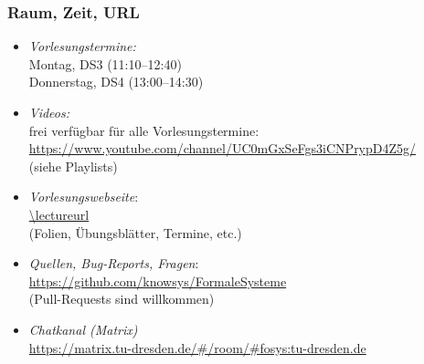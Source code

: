 \documentclass[aspectratio=1610,onlymath]{beamer}
\begin{document}
\maketitle



% 
% 

\begin{frame}\frametitle{Raum, Zeit, URL}

\begin{itemize}
\item \emph{Vorlesungstermine:}\\
	Montag, DS3 (11:10--12:40)\\
	Donnerstag, DS4 (13:00--14:30)
\item \emph{Videos:}\\
	frei verfügbar für alle Vorlesungstermine:\\
	\url{https://www.youtube.com/channel/UC0mGxSeFgs3iCNPrypD4Z5g/}\\
	(siehe Playlists)
\item \emph{Vorlesungswebseite}:\\[.5ex]
	\url{\lectureurl}\\[0.5ex]
	{\footnotesize(Folien, Übungsblätter, Termine, etc.)}
\item \emph{Quellen, Bug-Reports, Fragen}:\\[.5ex]
	\url{https://github.com/knowsys/FormaleSysteme}\\[.5ex]
	{\footnotesize(Pull-Requests sind willkommen)}
\item \emph{Chatkanal (Matrix)}\\[.5ex]
	\url{https://matrix.tu-dresden.de/\#/room/\#fosys:tu-dresden.de}
\end{itemize}

\end{frame}
\end{document}
